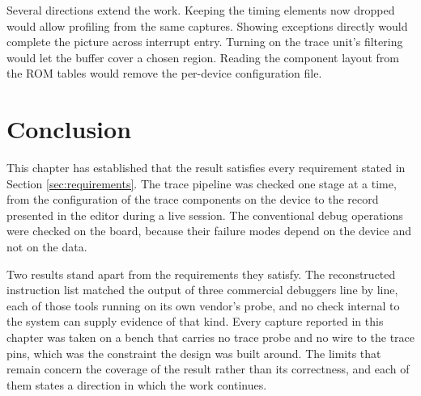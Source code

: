 Several directions extend the work. Keeping the timing elements now dropped would allow profiling from the same captures. Showing exceptions directly would complete the picture across interrupt entry. Turning on the trace unit's filtering would let the buffer cover a chosen region. Reading the component layout from the ROM tables would remove the per-device configuration file.


\section*{Conclusion}
This chapter has established that the result satisfies every requirement stated in Section \ref{sec:requirements}. The trace pipeline was checked one stage at a time, from the configuration of the trace components on the device to the record presented in the editor during a live session. The conventional debug operations were checked on the board, because their failure modes depend on the device and not on the data.

Two results stand apart from the requirements they satisfy. The reconstructed instruction list matched the output of three commercial debuggers line by line, each of those tools running on its own vendor's probe, and no check internal to the system can supply evidence of that kind. Every capture reported in this chapter was taken on a bench that carries no trace probe and no wire to the trace pins, which was the constraint the design was built around. The limits that remain concern the coverage of the result rather than its correctness, and each of them states a direction in which the work continues.
